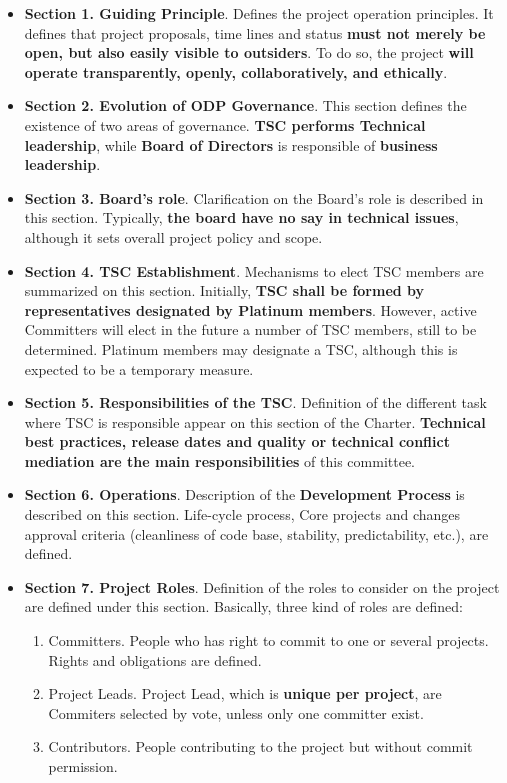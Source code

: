 \documentclass[a4paper, 12pt]{book}
\begin{document}
\begin{itemize}\itemsep0pt
\item{\textbf{Section 1. Guiding Principle}}. Defines the project operation principles. It defines that project proposals, time lines and status \textbf{must not merely be open, but also easily visible to outsiders}. To do so, the project \textbf{will operate transparently, openly, collaboratively, and ethically}.
\item{\textbf{Section 2. Evolution of ODP Governance}}. This section defines the existence of two areas of governance. \textbf{TSC performs Technical leadership}, while \textbf{Board of Directors} is responsible of \textbf{business leadership}.
\item{\textbf{Section 3. Board's role}}. Clarification on the Board's role is described in this section. Typically, \textbf{the board have no say in technical issues}, although it sets overall project policy and scope.
\item{\textbf{Section 4. TSC Establishment}}. Mechanisms to elect TSC members are summarized on this section. Initially, \textbf{TSC shall be formed by representatives designated by Platinum members}. However, active Committers will elect in the future a number of TSC members, still to be determined. Platinum members may designate a TSC, although this is expected to be a temporary measure.
\item{\textbf{Section 5. Responsibilities of the TSC}}. Definition of the different task where TSC is responsible appear on this section of the Charter. \textbf{Technical best practices, release dates and quality or technical conflict mediation are the main responsibilities} of this committee.
\item{\textbf{Section 6. Operations}}. Description of the \textbf{Development Process} is described on this section. Life-cycle process, Core projects and changes approval criteria (cleanliness of code base, stability, predictability, etc.), are defined.
\item{\textbf{Section 7. Project Roles}}. Definition of the roles to consider on the project are defined under this section. Basically, three kind of roles are defined:
\begin{enumerate}\itemsep0pt
\item{Committers}. People who has right to commit to one or several projects. Rights and obligations are defined.
\item{Project Leads}. Project Lead, which is \textbf{unique per project}, are Commiters selected by vote, unless only one committer exist.
\item{Contributors}. People contributing to the project but without commit permission.
\end{enumerate}
\end{itemize}
\end{document}
